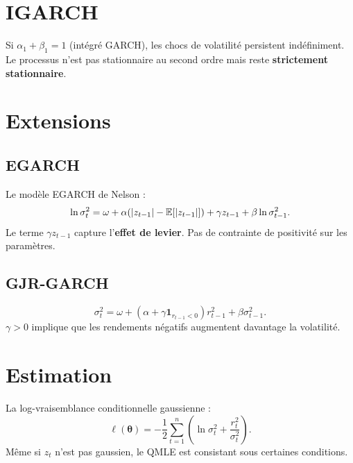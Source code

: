 \section{IGARCH}

\begin{definition}
Si $\alpha_1+\beta_1=1$ (int\'egr\'e GARCH), les chocs de volatilit\'e persistent ind\'efiniment. Le processus n'est pas stationnaire au second ordre mais reste \textbf{strictement stationnaire}.
\end{definition}

\section{Extensions}

\subsection{EGARCH}
\begin{definition}
Le mod\`ele EGARCH de Nelson :
\[
\ln\sigma_t^2 = \omega + \alpha(|z_{t-1}|-\mathbb{E}[|z_{t-1}|]) + \gamma z_{t-1} + \beta\ln\sigma_{t-1}^2.
\]
Le terme $\gamma z_{t-1}$ capture l'\textbf{effet de levier}. Pas de contrainte de positivit\'e sur les param\`etres.
\end{definition}

\subsection{GJR-GARCH}
\begin{definition}
\[
\sigma_t^2 = \omega + (\alpha+\gamma\mathbf{1}_{r_{t-1}<0})r_{t-1}^2 + \beta\sigma_{t-1}^2.
\]
$\gamma>0$ implique que les rendements n\'egatifs augmentent davantage la volatilit\'e.
\end{definition}

\section{Estimation}

\begin{definition}
La log-vraisemblance conditionnelle gaussienne :
\[
\ell(\bm\theta) = -\frac{1}{2}\sum_{t=1}^n\left(\ln\sigma_t^2 + \frac{r_t^2}{\sigma_t^2}\right).
\]
M\^eme si $z_t$ n'est pas gaussien, le QMLE est consistant sous certaines conditions.
\end{definition}

